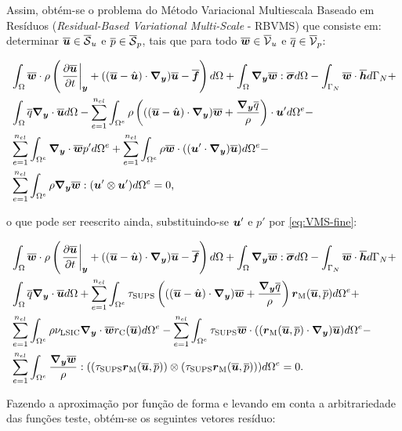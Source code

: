 Assim, obtém-se o problema do Método Variacional Multiescala Baseado em Resíduos (\textit{Residual-Based Variational Multi-Scale} - RBVMS) que consiste em: determinar $\overline{\boldsymbol{u}}\in\overline{\mathcal{S}}_u$ e $\overline{p}\in\overline{\mathcal{S}}_p$, tais que para todo $\overline{\boldsymbol{w}}\in\overline{\mathcal{V}}_u$ e $\overline{q}\in\overline{\mathcal{V}}_p$:

\begin{equation}
    \begin{split}
        &\intDom{\BBB{w}\cdot\rho\bigpar{\dTime{\BBB{u}}+((\BBB{u}-\HBB{u})\cdot\Ny)\BBB{u}-\BBB{f}}}+\intDom{\Ny\BBB{w}:\bar{\tens}}-\intNeumann{\BBB{w}\cdot\BBB{h}}+\\
        &\intDom{\bar{q}\Ny\cdot\BBB{u}}-\SintDom{\rho\bigpar{((\BBB{u}-\HBB{u})\cdot\Ny)\BBB{w}+\frac{\Ny\bar{q}}{\rho}}\cdot\BB{u}'}-\\
        &\SintDom{\Ny\cdot\BBB{w}p'}+\SintDom{\rho\BBB{w}\cdot((\BB{u}'\cdot\Ny)\BBB{u})}-\\
        &\SintDom{\rho\Ny\BBB{w}:(\BB{u}'\otimes\BB{u}')}=0
        \text{,}
        \label{eq:RBVMS1}
    \end{split}
\end{equation}

\noindent o que pode ser reescrito ainda, substituindo-se $\boldsymbol{u}'$ e $p'$ por \eqref{eq:VMS-fine}:

\begin{equation}
    \begin{split}
        &\intDom{\BBB{w}\cdot\rho\bigpar{\dTime{\BBB{u}}+((\BBB{u}-\HBB{u})\cdot\Ny)\BBB{u}-\BBB{f}}}+\intDom{\Ny\BBB{w}:\bar{\tens}}-\intNeumann{\BBB{w}\cdot\BBB{h}}+\\
        &\intDom{\bar{q}\Ny\cdot\BBB{u}}+\SintDom{\tau_\sups\bigpar{((\BBB{u}-\HBB{u})\cdot\Ny)\BBB{w}+\frac{\Ny\bar{q}}{\rho}}\rM}+\\
        &\SintDom{\rho\nu_\lsic\Ny\cdot\BBB{w}\rC}-\SintDom{\tau_\sups\BBB{w}\cdot((\rM\cdot\Ny)\BBB{u})}-\\
        &\SintDom{\frac{\Ny\BBB{w}}{\rho}:((\tau_\sups\rM)\otimes(\tau_\sups\rM))}=0
        \text{.}
        \label{eq:RBVMS1}
    \end{split}
\end{equation}

Fazendo a aproximação por função de forma e levando em conta a arbitrariedade das funções teste, obtém-se os seguintes vetores resíduo:

